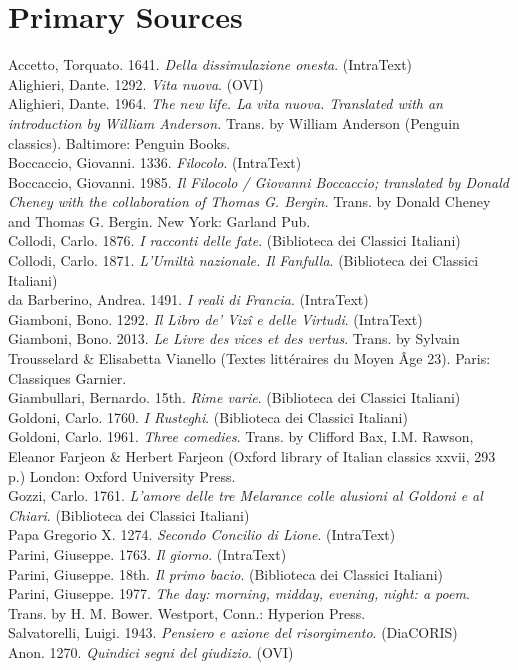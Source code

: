 \documentclass[output=paper,colorlinks,citecolor=brown]{langscibook}
\begin{document}
\section*{Primary Sources}
\smallskip Accetto, Torquato. 1641. \textit{Della dissimulazione onesta}. (IntraText)\\
\smallskip Alighieri, Dante. 1292. \textit{Vita nuova}. (OVI)\\
\smallskip Alighieri, Dante. 1964. \textit{The new life. La vita nuova. Translated with an introduction by William Anderson.} Trans. by William Anderson (Penguin classics). Baltimore: Penguin Books.\\
\smallskip Boccaccio, Giovanni. 1336. \textit{Filocolo}. (IntraText)\\
\smallskip Boccaccio, Giovanni. 1985. \textit{Il Filocolo / Giovanni Boccaccio; translated by Donald Cheney with the collaboration of Thomas G. Bergin.} Trans. by Donald Cheney and Thomas G. Bergin. New York: Garland Pub.\\
\smallskip Collodi, Carlo. 1876. \textit{I racconti delle fate}. (Biblioteca dei Classici Italiani)\\
\smallskip Collodi, Carlo. 1871. \textit{L’Umiltà nazionale. Il Fanfulla}. (Biblioteca dei Classici Italiani)\\
\smallskip da Barberino, Andrea. 1491. \textit{I reali di Francia}. (IntraText)\\
\smallskip Giamboni, Bono. 1292. \textit{Il Libro de’ Vizî e delle Virtudi}. (IntraText)\\
\smallskip Giamboni, Bono. 2013. \textit{Le Livre des vices et des vertus}. Trans. by Sylvain Trousselard \& Elisabetta Vianello (Textes littéraires du Moyen Âge 23). Paris: Classiques Garnier.\\
\smallskip Giambullari, Bernardo. 15th. \textit{Rime varie}. (Biblioteca dei Classici Italiani)\\
\smallskip Goldoni, Carlo. 1760. \textit{I Rusteghi}. (Biblioteca dei Classici Italiani)\\
\smallskip Goldoni, Carlo. 1961. \textit{Three comedies}. Trans. by Clifford Bax, I.M. Rawson, Eleanor Farjeon \& Herbert Farjeon (Oxford library of Italian classics xxvii, 293 p.) London: Oxford University Press.\\
\smallskip Gozzi, Carlo. 1761. \textit{L'amore delle tre Melarance colle alusioni al Goldoni e al Chiari}. (Biblioteca dei Classici Italiani)\\
\smallskip Papa Gregorio X. 1274. \textit{Secondo Concilio di Lione}. (IntraText)\\
\smallskip Parini, Giuseppe. 1763. \textit{Il giorno}. (IntraText)\\
\smallskip Parini, Giuseppe. 18th. \textit{Il primo bacio}. (Biblioteca dei Classici Italiani)\\
\smallskip Parini, Giuseppe. 1977. \textit{The day: morning, midday, evening, night: a poem}. Trans. by H. M. Bower. Westport, Conn.: Hyperion Press.\\
\smallskip Salvatorelli, Luigi. 1943. \textit{Pensiero e azione del risorgimento}. (DiaCORIS)\\
\smallskip Anon. 1270. \textit{Quindici segni del giudizio}. (OVI)
\printbibliography[heading=subbibliography,notkeyword=this]
\end{document}
